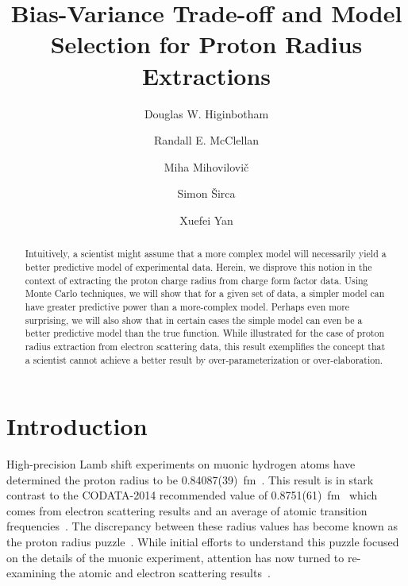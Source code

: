 \documentclass[10pt,superscriptaddress,aps,prc,twocolumn]{revtex4-1}
\begin{document}
\title{Bias-Variance Trade-off and Model Selection for Proton Radius Extractions}

\author{Douglas W. Higinbotham}

\author{Randall E. McClellan}

\author{Miha Mihovilovi\v{c}}

\author{Simon \v{S}irca}

\author{Xuefei Yan}

\begin{abstract}
Intuitively, a scientist might assume that a more complex model will necessarily yield a better
predictive model of experimental data.   Herein, we disprove this notion in the context of extracting 
the proton charge radius from charge form factor data.   Using Monte Carlo techniques, we will show that 
for a given set of data, a simpler model can have greater predictive power than a 
more-complex model.   Perhaps even more surprising, we will also show that in certain cases the simple model 
can even be a better predictive model than the true function.   While illustrated for the case of proton
radius extraction from electron scattering data, this result exemplifies the concept that 
a scientist cannot achieve a better result by over-parameterization or over-elaboration. 
\end{abstract}

\maketitle

\section{Introduction}

High-precision Lamb shift experiments on muonic hydrogen atoms have determined the proton radius to 
be 0.84087(39)~fm~\cite{Pohl:2010zza,Antognini:1900ns}.   This result is in stark contrast to the
CODATA-2014 recommended value of 0.8751(61)~fm~\cite{Mohr:2015ccw} which comes 
from electron scattering results and an average of atomic transition 
frequencies~\cite{Boshier:1989zz,Weitz:1994zz,Berkeland:1995dyd,Bourzeix:1996zz,Udem:1997zz}.
The discrepancy between these radius values has become known as the proton 
radius puzzle~\cite{Pohl:2013yb,Carlson:2015jba,Gao:2015aax,Pohl:2016tqq,Nez:2011zz,Krauth:2017ijq}.
While initial efforts to understand this puzzle focused on the details of the muonic experiment, attention has
now turned to re-examining the atomic and electron scattering 
results~\cite{Kelkar:2016tcx,Beyer79,fleurbaey:tel-01633631,Fleurbaey:2018fih}.   
\end{document}
